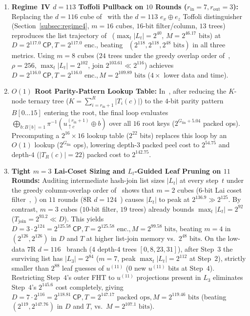 \documentclass[11pt,a4paper]{article}
\theoremstyle{definition}
\theoremstyle{remark}
\newcommand{\CP}{\mathsf{CP}}
\begin{document}
\begin{enumerate}[leftmargin=1.8em]
    \item \textbf{Regime~IV $d = 113$ Toffoli Pullback on $10$ Rounds ($r_{\text{in}} = 7, r_{\text{out}} = 3$):} Replacing the $d = 116$ cube of~\cite[$\S$3.2]{DG25} with the $d = 113$ $e_x \oplus e_z$ Toffoli distinguisher~\cite{BRRT25} (Section~\ref{subsec:regime4}, $m = 16$ cubes, $16$-bit filter/column, $13$ trees) reproduces the list trajectory of~\cite[Table~7]{DG25} ($\max_t |L_t| = 2^{40}$, $M = 2^{46.17}\text{ bits}$) at $D = 2^{117.0}~\CP, T = 2^{117.0}\text{ enc.}$, beating~\cite[$\S$3.2]{DG25} $(2^{118}, 2^{118}, 2^{48}\text{ bits})$ in all three metrics. Using $m = 8$ cubes ($24$ trees under the greedy overlap order of~\cite{DG25}, $\rho = 256$, $\max_t |L_t| = 2^{102}$, join $2^{103.61} \ll 2^{116}$) achieves $D = 2^{116.0}~\CP, T = 2^{116.0}\text{ enc.}, M = 2^{109.89}\text{ bits}$ ($4\times$ lower data and time).
    \item \textbf{$O(1)$ Root Parity-Pattern Lookup Table:} In~\cite[Algorithm~3]{DG25}, after reducing the $K$-node ternary tree ($K = \sum_{i=r_{\text{in}}+1}^{R} |T_i(c)|$) to the $4$-bit parity pattern $B[0\dots 15]$ entering the root, the final loop evaluates $\bigoplus_{b: B[b]=1} \pi^{-1}(u^{(r_{\text{in}}+1)}_{\uparrow c} \oplus b)$ over all $16$ root keys ($2^{G_{\text{fin}} + 5.04}$ packed ops). Precomputing a $2^{16} \times 16$ lookup table ($2^{22}$ bits) replaces this loop by an $O(1)$ lookup ($2^{G_{\text{fin}}}$ ops), lowering depth-$3$ packed peel cost to $2^{54.75}$ and depth-$4$ ($|T_R(c)|=22$) packed cost to $2^{142.75}$.
    \item \textbf{Tight $m = 3$ Lai-Coset Sizing and $L_t$-Guided Leaf Pruning on $11$ Rounds:} Auditing intermediate hash-join list sizes $|L_t|$ at every step~$t$ under the greedy column-overlap order of~\cite{DG25} shows that $m = 2$ cubes ($6$-bit Lai coset filter~\cite{Lai94},~\cite[Table~5]{DG25}) on $11$ rounds ($8$R $d = 124$~\cite{BRRT25}) causes $|L_t|$ to peak at $2^{136.9} \gg 2^{125}$. By contrast, $m = 3$ cubes ($10$-bit filter, $19$ trees) already bounds $\max_t |L_t| = 2^{92}$ ($T_{\text{join}} = 2^{93.2} \ll D$). This yields $D = 3 \cdot 2^{124} = 2^{125.58}~\CP, T = 2^{125.58}\text{ enc.}, M = 2^{99.58}\text{ bits}$, beating $m = 4$ in~\cite[$\S$3.3]{DG25} $(2^{126}, 2^{126})$ in $D$ and $T$ at higher list-join memory vs.\ $2^{48}\text{ bits}$. On the low-data $7$R $d = 116$~\cite{DG25} branch ($4$ depth-$4$ trees $[0, 8, 23, 31]$), after Step~$3$ the surviving list has $|L_3| = 2^{84}$ ($m=7$, peak $\max_t |L_t| = 2^{112}$ at Step~$2$), strictly smaller than $2^{88}$ leaf guesses of $u^{(11)}$ ($0$ new $u^{(11)}$ bits at Step~$4$). Restricting Step~$4$'s outer FHT to $u^{(11)}$ projections present in $L_3$ eliminates Step~$4$'s $2^{145.6}$ cost completely, giving $D = 7 \cdot 2^{116} = 2^{118.81}~\CP, T = 2^{147.17}\text{ packed ops}, M = 2^{119.46}\text{ bits}$ (beating~\cite[$\S$3.4]{DG25} $(2^{119}, 2^{147.76})$ in $D$ and $T$, vs.\ $M = 2^{107.1}\text{ bits}$).

\end{enumerate}
\end{document}
